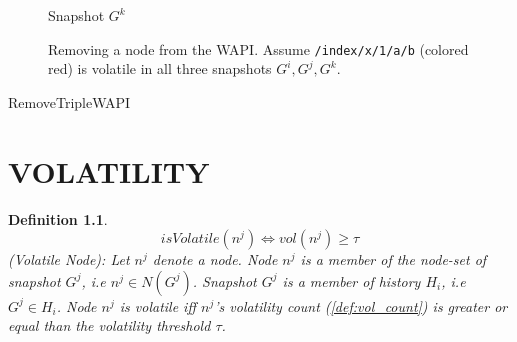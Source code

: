 \documentclass[abstracton,12pt]{scrreprt}
\newtheorem{definition}{Definition}
\begin{document}
\begin{figure}[h]
\begin{scriptsize}
\begin{multicols}{3}
\begin{center}
                Snapshot $G^k$
            \end{center}
        \end{multicols}
    \end{scriptsize}
    \caption{Removing a node from the WAPI. Assume \texttt{/index/x/1/a/b} (colored red) is volatile in all three snapshots $G^i, G^j, G^k$.}
    \label{fig:remove_wapi}
\end{figure}

\begin{algorithm}[H]
    \label{algo:remove_triple_wapi}
    \caption{RemoveTripleWAPI}
    \DontPrintSemicolon
    \begin{footnotesize}
    \end{footnotesize}
\end{algorithm}

\chapter{VOLATILITY}
\label{ch:volatility}

\begin{definition}
    \begin{equation}
            isVolatile(n^j) \iff vol(n^j) \geq \tau 
    \end{equation}
    (Volatile Node): Let $n^j$ denote a node. 
    Node $n^j$ is a member of the node-set of snapshot $G^j$, i.e $n^j \in N(G^j)$.
    Snapshot $G^j$ is a member of history $H_i$, i.e $G^j \in H_i$.
    Node $n^j$ is volatile iff $n^j$'s volatility count (\cref{def:vol_count}) is greater or equal than the volatility threshold $\tau$.
\end{definition}
\end{document}
